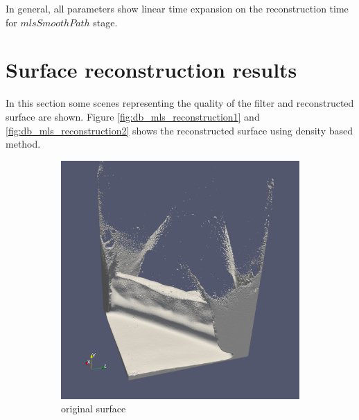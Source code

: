 In general, all parameters show linear time expansion on the reconstruction time for $mlsSmoothPath$ stage.

\section{Surface reconstruction results}
In this section some scenes representing the quality of the filter and reconstructed surface are shown. 
Figure \ref{fig:db_mls_reconstruction1} and \ref{fig:db_mls_reconstruction2} shows the reconstructed surface using density based method.
\begin{figure}
	\begin{center}
		\begin{subfigure}[b]{0.47\textwidth}
			\includegraphics[width=\textwidth]{figures/DDMOriginal1.png}
			\caption{original surface}
		\end{subfigure}
		\begin{subfigure}[b]{0.47\textwidth}

\end{subfigure}
\end{center}
\end{figure}
